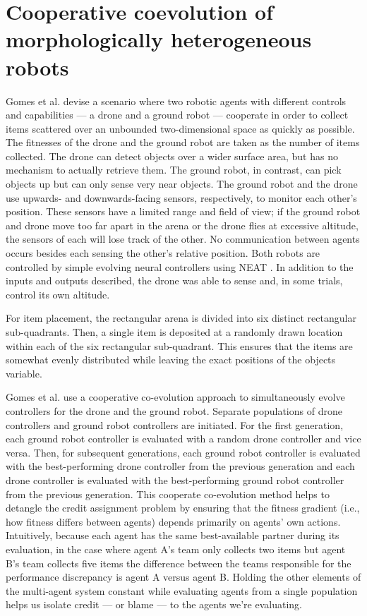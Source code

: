 \section{Cooperative coevolution of morphologically heterogeneous robots \cite{gomes2015cooperative}}

Gomes et al. devise a scenario where two robotic agents with different controls and capabilities --- a drone and a ground robot --- cooperate in order to collect items scattered over an unbounded two-dimensional space as quickly as possible.
The fitnesses of the drone and the ground robot are taken as the number of items collected.
The drone can detect objects over a wider surface area, but has no mechanism to actually retrieve them.
The ground robot, in contrast, can pick objects up but can only sense very near objects.
The ground robot and the drone use upwards- and downwards-facing sensors, respectively, to monitor each other's position.
These sensors have a limited range and field of view; if the ground robot and drone move too far apart in the arena or the drone flies at excessive altitude, the sensors of each will lose track of the other.
No communication between agents occurs besides each sensing the other's relative position.
Both robots are controlled by simple evolving neural controllers using NEAT \cite{stanley2002evolving}.
In addition to the inputs and outputs described, the drone was able to sense and, in some trials, control its own altitude.

For item placement, the rectangular arena is divided into six distinct rectangular sub-quadrants.
Then, a single item is deposited at a randomly drawn location within each of the six rectangular sub-quadrant.
This ensures that the items are somewhat evenly distributed while leaving the exact positions of the objects variable.

Gomes et al. use a cooperative co-evolution approach to simultaneously evolve controllers for the drone and the ground robot.
Separate populations of drone controllers and ground robot controllers are initiated.
For the first generation, each ground robot controller is evaluated with a random drone controller and vice versa.
Then, for subsequent generations, each ground robot controller is evaluated with the best-performing drone controller from the previous generation and each drone controller is evaluated with the best-performing ground robot controller from the previous generation.
This cooperate co-evolution method helps to detangle the credit assignment problem by ensuring that the fitness gradient (i.e., how fitness differs between agents) depends primarily on agents' own actions.
Intuitively, because each agent has the same best-available partner during its evaluation, in the case where agent A's team only collects two items but agent B's team collects five items the difference between the teams responsible for the performance discrepancy is agent A versus agent B.
Holding the other elements of the multi-agent system constant while evaluating agents from a single population helps us isolate credit --- or blame --- to the agents we're evaluating.

